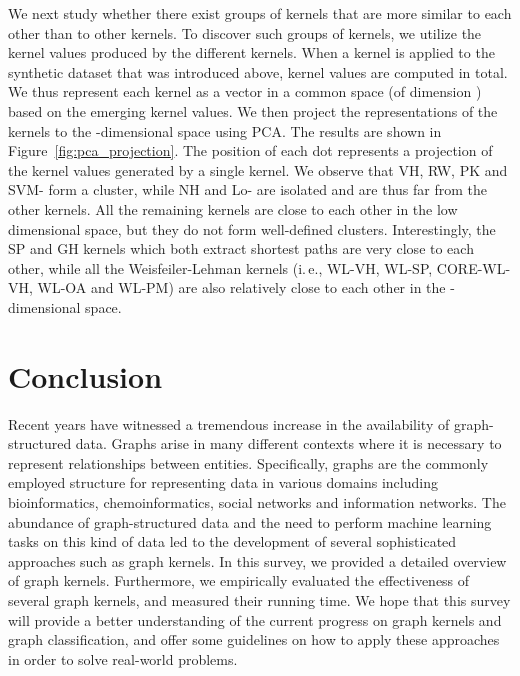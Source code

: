 \documentclass[twoside,11pt]{article}
\newcommand{\ie}{i.\,e., }
\begin{document}
We next study whether there exist groups of kernels that are more similar to each other than to other kernels.
To discover such groups of kernels, we utilize the kernel values produced by the different kernels.
When a kernel is applied to the synthetic dataset that was introduced above,  kernel values are computed in total.
We thus represent each kernel as a vector in a common space (of dimension ) based on the emerging kernel values.
We then project the representations of the kernels to the -dimensional space using PCA.
The results are shown in Figure~\ref{fig:pca_projection}.
The position of each dot represents a projection of the kernel values generated by a single kernel.
We observe that VH, RW, PK and SVM- form a cluster, while NH and Lo- are isolated and are thus far from the other kernels.
All the remaining kernels are close to each other in the low dimensional space, but they do not form well-defined clusters.
Interestingly, the SP and GH kernels which both extract shortest paths are very close to each other, while all the Weisfeiler-Lehman kernels (\ie WL-VH, WL-SP, CORE-WL-VH, WL-OA and WL-PM) are also relatively close to each other in the -dimensional space.

\section{Conclusion}\label{sec:conclusion}
Recent years have witnessed a tremendous increase in the availability of graph-structured data.
Graphs arise in many different contexts where it is necessary to represent relationships between entities.
Specifically, graphs are the commonly employed structure for representing data in various domains including bioinformatics, chemoinformatics, social networks and information networks.
The abundance of graph-structured data and the need to perform machine learning tasks on this kind of data led to the development of several sophisticated approaches such as graph kernels.
In this survey, we provided a detailed overview of graph kernels.
Furthermore, we empirically evaluated the effectiveness of several graph kernels, and measured their running time.
We hope that this survey will provide a better understanding of the current progress on graph kernels and graph classification, and offer some guidelines on how to apply these approaches in order to solve real-world problems.
\end{document}

